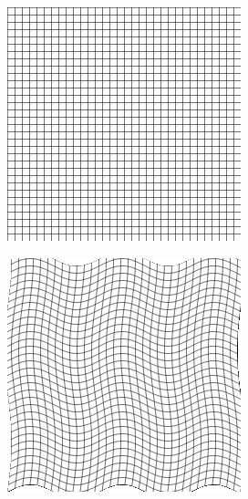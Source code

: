 \begin{figure}[H]
    \centering
	\begin{subfigure}[t]{0.3\textwidth}
	  \includegraphics[width=\textwidth]{figuras/grid.png}
	  \label{fig:ref-image}
	\end{subfigure}
	\begin{subfigure}[t]{0.3\textwidth}
	  \includegraphics[width=\textwidth]{figuras/gridSin.png}

\end{subfigure}
\end{figure}
